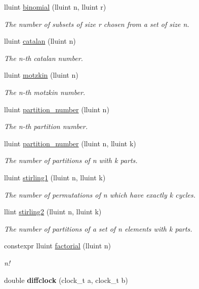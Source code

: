 \begin{DoxyCompactItemize}
\item 
lluint \hyperlink{namespacedscr_ab4cfc6d9fefa7536fc8914cf6f5e8236}{binomial} (lluint n, lluint r)
\begin{DoxyCompactList}\small\item\em The number of subsets of size r chosen from a set of size n. \end{DoxyCompactList}\item 
lluint \hyperlink{namespacedscr_a36ff2694e4aa8ced010f5e3046aa940e}{catalan} (lluint n)
\begin{DoxyCompactList}\small\item\em The n-\/th catalan number. \end{DoxyCompactList}\item 
lluint \hyperlink{namespacedscr_a212a60e3cca7da1da5a823890541f2b0}{motzkin} (lluint n)
\begin{DoxyCompactList}\small\item\em The n-\/th motzkin number. \end{DoxyCompactList}\item 
lluint \hyperlink{namespacedscr_a59ddffe5f38d751cdc40c23295a5de0c}{partition\-\_\-number} (lluint n)
\begin{DoxyCompactList}\small\item\em The n-\/th partition number. \end{DoxyCompactList}\item 
lluint \hyperlink{namespacedscr_a28ad2a2fe86ed01b0be3111ed52e2741}{partition\-\_\-number} (lluint n, lluint k)
\begin{DoxyCompactList}\small\item\em The number of partitions of n with k parts. \end{DoxyCompactList}\item 
lluint \hyperlink{namespacedscr_aadc8642dfb56d21ee917c9cad1e1ec0d}{stirling1} (lluint n, lluint k)
\begin{DoxyCompactList}\small\item\em The number of permutations of n which have exactly k cycles. \end{DoxyCompactList}\item 
llint \hyperlink{namespacedscr_a7f50bb9f5d544c3dce41985c3eace98a}{stirling2} (lluint n, lluint k)
\begin{DoxyCompactList}\small\item\em The number of partitions of a set of n elements with k parts. \end{DoxyCompactList}\item 
constexpr lluint \hyperlink{namespacedscr_aa52cb363aa164acb87cdd883ce5a94e3}{factorial} (lluint n)
\begin{DoxyCompactList}\small\item\em n! \end{DoxyCompactList}\item 
\hypertarget{namespacedscr_a5e8832d5ea31873a72dd44e95a24c17a}{double {\bfseries diffclock} (clock\-\_\-t a, clock\-\_\-t b)}\label{namespacedscr_a5e8832d5ea31873a72dd44e95a24c17a}


\end{DoxyCompactItemize}
